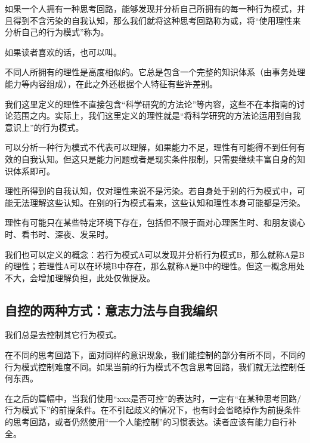 如果一个人拥有一种思考回路，能够发现并分析自己所拥有的每一种行为模式，并且得到不含污染的自我认知，那么我们就将这种思考回路称为或，将“使用理性来分析自己的行为模式”称为。
\begin{explain}
如果读者喜欢的话，也可以叫。

不同人所拥有的理性是高度相似的。它总是包含一个完整的知识体系（由事务处理能力等内容组成），在此之外还根据个人特征有些许差别。

我们这里定义的理性不直接包含“科学研究的方法论”等内容，这些不在本指南的讨论范围之内。实际上，我们这里定义的理性就是“将科学研究的方法论运用到自我意识上”的行为模式。

可以分析一种行为模式不代表可以理解，如果能力不足，理性有可能得不到任何有效的自我认知。但这只是能力问题或者是现实条件限制，只需要继续丰富自身的知识体系即可。

理性所得到的自我认知，仅对理性来说不是污染。若自身处于别的行为模式中，可能无法理解这些认知。在别的行为模式看来，这些认知和理性本身可能都是污染。

理性有可能只在某些特定环境下存在，包括但不限于面对心理医生时、和朋友谈心时、看书时、深夜、发呆时。

我们也可以定义的概念：若行为模式A可以发现并分析行为模式B，那么就称A是B的理性；若理性A可以在环境B中存在，那么就称A是B中的理性。但这一概念用处不大，会增加理解负担，此处仅做提及。
\end{explain}

\subsection{自控的两种方式：意志力法与自我编织\label{sec:自控}}
\noindent 我们总是去控制其它行为模式。
\begin{explain}
在不同的思考回路下，面对同样的意识现象，我们能控制的部分有所不同，不同的行为模式控制难度不同。如果当前的行为模式不包含思考回路，我们就无法控制任何东西。

在之后的篇幅中，当我们使用“xxx是否可控”的表达时，一定有“在某种思考回路/行为模式下”的前提条件。在不引起歧义的情况下，也有时会省略掉作为前提条件的思考回路，或者仍然使用“一个人能控制”的习惯表达。读者应该有能力自行补全。
\end{explain}

